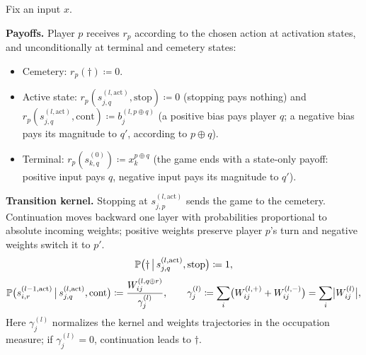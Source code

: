 \begin{definition}\label{ptnb:def:adf-recursion}
Fix an input $x$.

\textbf{Payoffs.} Player $p$ receives $r_p$ according to the chosen action at activation states,
and unconditionally at terminal and cemetery states:
\begin{itemize}
    \item Cemetery: $r_p(\dagger) \coloneqq 0$.
    \item Active state: $r_p(s_{j,q}^{(l, \mathrm{act})}, \mathrm{stop}) \coloneqq 0$ (stopping pays nothing)
        and $r_p(s_{j,q}^{(l, \mathrm{act})}, \mathrm{cont}) \coloneqq b_j^{(l, p \oplus q)}$ (a positive bias
        pays player $q$; a negative bias pays its magnitude to $q'$, according to $p\oplus q$).
    \item Terminal: $r_p(s_{k,q}^{(0)}) \coloneqq x_k^{p \oplus q}$ (the game ends with a state-only payoff:
        positive input pays $q$, negative input pays its magnitude to $q'$).
\end{itemize}

\textbf{Transition kernel.} Stopping at $s^{(l,\mathrm{act})}_{j,p}$ sends the game to the cemetery.
Continuation moves backward one layer with probabilities proportional to absolute incoming weights;
positive weights preserve player $p$'s turn and negative weights switch it to $p'$.
\begin{align}\label{ptnb:eq:adf-kernel-stop}
    \P\bigl(\dagger \,\big|\, s_{j,q}^{(l, \mathrm{act})}, \mathrm{stop}\bigr) \coloneqq 1,
\end{align}
\begin{align}\label{ptnb:eq:adf-kernel}
    \P\bigl(s_{i,r}^{(l-1, \mathrm{act})} \,\big|\, s_{j,q}^{(l, \mathrm{act})}, \mathrm{cont}\bigr)
    \coloneqq \frac{W_{ij}^{(l, q \oplus r)}}{\gamma_j^{(l)}},
    \qquad
    \gamma_j^{(l)} \coloneqq \sum_i \bigl(W_{ij}^{(l,+)} + W_{ij}^{(l,-)}\bigr) = \sum_i
    \bigl|W_{ij}^{(l)}\bigr|,
\end{align}
Here $\gamma_j^{(l)}$ normalizes the kernel and weights trajectories in the occupation measure;
if $\gamma_j^{(l)}=0$, continuation leads to $\dagger$.


\end{definition}
